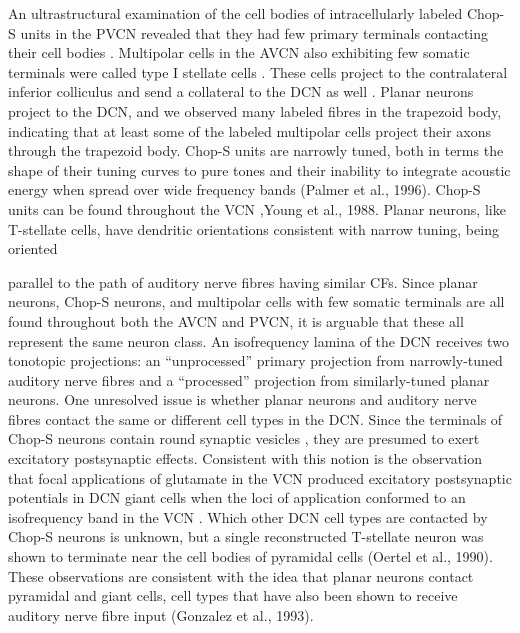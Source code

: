 \documentclass[10pt,a4paper]{article}
\begin{document}
An ultrastructural examination of the cell bodies of intracellularly labeled
Chop-S units in the PVCN revealed that they had few primary terminals contacting their cell bodies
\citep{SmithRhode:1989}. Multipolar cells in the AVCN also exhibiting few
somatic terminals were called type I stellate cells \citep{Cant:1981}. These
cells project to the contralateral inferior colliculus \citep{Cant:1982} and
send a collateral to the DCN as well \citep{Adams:1983}. Planar neurons project
to the DCN, and we observed many labeled fibres in the trapezoid body,
indicating that at least some of the labeled multipolar cells project their
axons through the trapezoid body. Chop-S units are narrowly tuned, both in terms
the shape of their tuning curves to pure tones \citep{RhodeSmith:1986} and their
inability to integrate acoustic energy when spread over wide frequency bands
(Palmer et al., 1996).  Chop-S units can be found throughout the VCN
\citep{Pfeiffer:1966,Bourk, 1976},Young et al., 1988. Planar neurons, like
T-stellate cells, have dendritic orientations consistent with narrow tuning,
being oriented

parallel to the path of auditory nerve fibres having similar CFs. Since planar
neurons, Chop-S neurons, and multipolar cells with few somatic terminals are all
found throughout both the AVCN and PVCN, it is arguable that these all represent
the same neuron class. An isofrequency lamina of the DCN receives two tonotopic
projections: an ``unprocessed''
primary projection from narrowly-tuned auditory nerve fibres and a
``processed'' projection from similarly-tuned planar neurons.
One unresolved issue is whether planar neurons and auditory nerve fibres contact
the same or different cell
types in the DCN. Since the terminals of Chop-S neurons contain round synaptic
vesicles \citep{SmithRhode:1989}, they are presumed to exert excitatory
postsynaptic effects. Consistent with this notion is the observation that focal
applications of glutamate in the VCN produced excitatory postsynaptic potentials
in DCN giant cells when the loci of application conformed to an isofrequency
band in the VCN \citep{ZhangOertel:1993a}. Which other DCN cell types are
contacted by Chop-S neurons is unknown, but a single reconstructed T-stellate
neuron was shown to terminate near the cell bodies of pyramidal cells (Oertel et
al., 1990). These observations are consistent with the idea that planar neurons
contact pyramidal and giant cells, cell types that have also been shown to
receive auditory nerve fibre input (Gonzalez et al., 1993).
\end{document}
